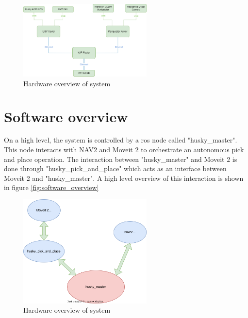 \begin{figure}[H]
  \centering
  \includegraphics[width = 0.6\textwidth]{Figures/example_figure.drawio.png}
  \caption{Hardware overview of system}
  \label{fig:hardware_overview}
\end{figure}


\section{Software overview}
On a high level, the system is controlled by a ros node called "husky\_master". This node interacts with NAV2 and Moveit 2 to orchestrate an autonomous pick and place operation. The interaction between "husky\_master" and Moveit 2 is done through "husky\_pick\_and\_place" which acts as an interface between Moveit 2 and "husky\_master". A high level overview of this interaction is shown in figure \ref{fig:software_overview}

\begin{figure}[H]
  \centering
  \includegraphics[width = 0.6\textwidth]{Figures/software_overview.drawio.svg}
  \caption{Hardware overview of system}
  \label{fig:hardware_overview}
\end{figure}